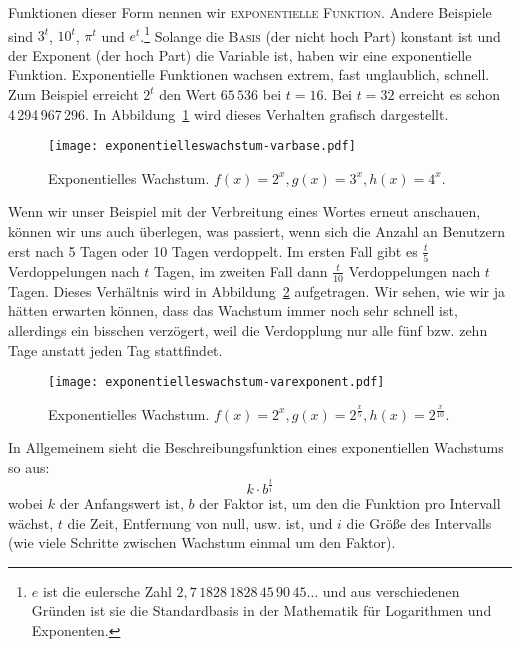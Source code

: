 \documentclass[a4paper,12pt,oneside,leqno]{scrartcl}%
\newcommand{\enquote}[1]{\frqq{}#1\flqq{}}
\newcommand{\terminus}[1]{\textsc{#1}}
\newcommand{\sep}{,\!}
\begin{document}
Funktionen dieser Form nennen wir \terminus{exponentielle Funktion}.  
Andere Beispiele sind $3^{t}$, $10^{t}$, $\pi^{t}$ und $e^{t}$.\footnote{$e$ ist die eulersche Zahl $2\sep{}7\,1828\,1828\,45\,90\,45\ldots$ und aus verschiedenen Gründen ist sie die Standardbasis in der Mathematik für Logarithmen und Exponenten.}  
Solange die \terminus{Basis} (der nicht \enquote{hoch} Part) konstant ist und der Exponent (der \enquote{hoch} Part) die Variable ist, haben wir eine exponentielle Funktion.  Exponentielle Funktionen wachsen extrem, fast unglaublich, schnell. Zum Beispiel erreicht $2^{t}$ den Wert $65\,536$ bei $t=16$.  Bei $t=32$ erreicht es schon 4\,294\,967\,296. In Abbildung~\ref{fig:expwachstum-varbase} wird dieses Verhalten grafisch dargestellt. 
\begin{figure}[htb]
\begin{center}
\texttt{[image: exponentielleswachstum-varbase.pdf]}
\end{center}
\caption{Exponentielles Wachstum. $f(x)=2^{x}, g(x)=3^{x}, h(x)=4^{x}$.}\label{fig:expwachstum-varbase}
\end{figure}

Wenn wir unser Beispiel mit der Verbreitung eines Wortes erneut anschauen, können wir uns auch überlegen, was passiert, wenn sich die Anzahl an Benutzern erst nach 5 Tagen oder 10 Tagen verdoppelt.  Im ersten Fall gibt es $\frac{t}{5}$ Verdoppelungen nach $t$ Tagen, im zweiten Fall dann  $\frac{t}{10}$ Verdoppelungen nach $t$ Tagen.  Dieses Verhältnis wird in Abbildung~\ref{fig:expwachstum-varexp} aufgetragen.  Wir sehen, wie wir ja hätten erwarten können, dass das Wachstum immer noch sehr schnell ist, allerdings ein bisschen verzögert, weil die Verdopplung nur alle fünf bzw. zehn Tage anstatt jeden Tag stattfindet.
\begin{figure}[htb]
\begin{center}
\texttt{[image: exponentielleswachstum-varexponent.pdf]}
\end{center}
\caption{Exponentielles Wachstum. $f(x)=2^{x}, g(x)=2^{\frac{x}{5}}, h(x)=2^{\frac{x}{10}}$.}\label{fig:expwachstum-varexp}
\end{figure}

In Allgemeinem sieht die Beschreibungsfunktion eines exponentiellen Wachstums so aus:
\begin{equation}
k\cdot{}b^{\frac{t}{i}}\label{eq:expwachs}
\end{equation}
wobei $k$ der Anfangswert ist, $b$ der Faktor ist, um den die Funktion pro Intervall wächst, $t$ die Zeit, Entfernung von null, usw. ist, und $i$ die Größe des Intervalls  (wie viele Schritte zwischen Wachstum einmal um den Faktor).
 
\end{document}
